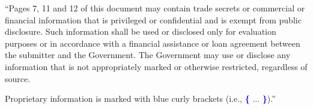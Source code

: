 \documentclass[12pt,portrait]{article} %
\date{}
\begin{document}
\maketitle


``Pages 7, 11 and 12 of this document may contain trade secrets or commercial 
or financial information that is privileged or confidential and is exempt from 
public disclosure. Such information shall be used or disclosed only for 
evaluation purposes or in accordance with a financial assistance or loan 
agreement between the submitter and the Government. The Government may use or 
disclose any information that is not appropriately marked or otherwise 
restricted, regardless of source. 

Proprietary information is marked with blue 
curly brackets (i.e., \textcolor{blue}{\textbf{\{}} ... 
\textcolor{blue}{\textbf{\}}}).''

\newpage


\end{document}
